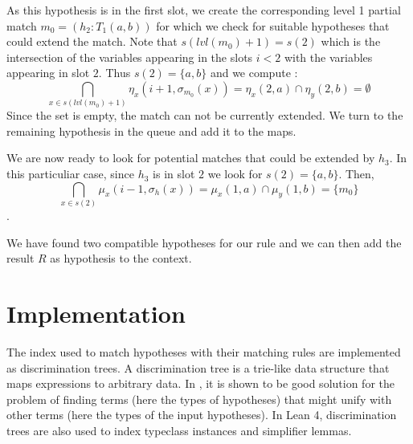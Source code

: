 \documentclass[runningheads]{llncs}
\newcommand{\xcom}[1]{{\color{cyan}{Xavier: #1}} }
\begin{document}
  As this hypothesis is in the first slot, we create the corresponding level 1 partial
  match $m_0 = {(h_2 : T_1(a, b))}$ for which we check for suitable hypotheses that could
  extend the match.
  Note that  $s(lvl(m_0) + 1) = s(2)$ which is the intersection of the variables
  appearing in the slots $i < 2$ with the variables appearing in slot $2$.
  Thus $s(2) = \{a,b\}$ and we compute :
  $$\bigcap_{x\in s(lvl(m_0) + 1)} \eta_x \left(i + 1, \sigma_{m_0}(x)\right)
    = \eta_x(2, a) \cap \eta_y(2, b) = \emptyset $$
  Since the set is empty, the match can not be currently extended.
  We turn to the remaining hypothesis in the queue and add it to the maps.


  We are now ready to look for potential matches that could be extended by $h_3$.
  In this particuliar case, since $h_3$ is in slot $2$ we look for $s(2) = \{a,b\}$.
  Then,
  $$\bigcap_{x\in s(2)} \mu_x \left(i - 1, \sigma_h(x)\right)
    = \mu_x(1, a) \cap \mu_y(1, b) = \{m_0\} $$.

  We have found two compatible hypotheses for our rule and we can then add the 
  result $R$ as hypothesis to the context.


\section{Implementation}

\xcom{Here are some notes about the implementation.}
The index used to match hypotheses with their matching rules are implemented as
discrimination trees. A discrimination tree is a trie-like data
structure that maps expressions to arbitrary data.
In \cite{}, it is shown to be good solution for the problem of finding
terms (here the types of hypotheses) that might unify with other terms
(here the types of the input hypotheses).
In Lean 4, discrimination trees are also used to index typeclass
instances and simplifier lemmas.
\end{document}
